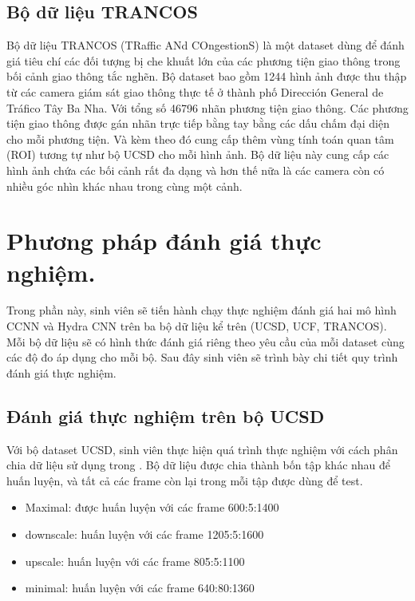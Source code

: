 \subsection{Bộ dữ liệu TRANCOS}
	Bộ dữ liệu TRANCOS (TRaffic ANd COngestionS) \cite{guerrero2015extremely} là một dataset dùng để đánh giá tiêu chí các đối tượng bị che khuất lớn của các phương tiện giao thông trong bối cảnh giao thông tắc nghẽn. Bộ dataset bao gồm 1244 hình ảnh được thu thập từ các camera giám sát giao thông thực tế ở thành phố Dirección General de Tráfico Tây Ba Nha. Với tổng số 46796 nhãn phương tiện giao thông. Các phương tiện giao thông được gán nhãn trực tiếp bằng tay bằng các dấu chấm đại diện cho mỗi phương tiện. Và kèm theo đó cung cấp thêm vùng tính toán quan tâm (ROI) tương tự như bộ UCSD cho mỗi hình ảnh. Bộ dữ liệu này cung cấp các hình ảnh chứa các bối cảnh rất đa dạng và hơn thế nữa là các camera còn có nhiều góc nhìn khác nhau trong cùng một cảnh. \par 
  
\section{Phương pháp đánh giá thực nghiệm.}
	Trong phần này, sinh viên sẽ tiến hành chạy thực nghiệm đánh giá hai mô hình CCNN và Hydra CNN trên ba bộ dữ liệu kể trên (UCSD, UCF, TRANCOS). Mỗi bộ dữ liệu sẽ có hình thức đánh giá riêng theo yêu cầu của mỗi dataset cùng các độ đo áp dụng cho mỗi bộ. Sau đây sinh viên sẽ trình bày chi tiết quy trình đánh giá thực nghiệm.
\subsection{Đánh giá thực nghiệm trên bộ UCSD} 
	Với bộ dataset UCSD, sinh viên thực hiện quá trình thực nghiệm với cách phân chia dữ liệu sử dụng trong \cite{onoro2016towards,zhang2015cross,lempitsky2010learning,fiaschi2012learning,
	ryan2009crowd}. Bộ dữ liệu được chia thành bốn tập khác nhau để huấn luyện, và tất cả các frame còn lại trong mỗi tập được dùng để test.
	\begin{itemize}
		\item Maximal: được huấn luyện với các frame 600:5:1400
		\item downscale: huấn luyện với các frame 1205:5:1600
		\item upscale: huấn luyện với các frame 805:5:1100
		\item minimal: huấn luyện với các frame 640:80:1360
	\end{itemize}	
	

